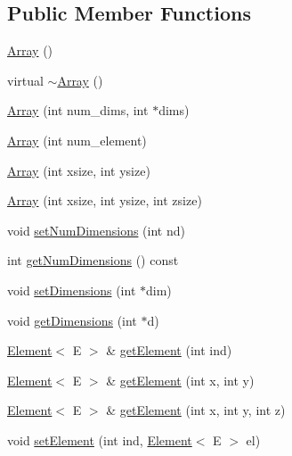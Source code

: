 \subsection*{Public Member Functions}
\begin{DoxyCompactItemize}
\item 
\mbox{\hyperlink{classbridges_1_1_array_a958421b86ff55303b5fc7d505109f9fe}{Array}} ()
\item 
virtual \mbox{\hyperlink{classbridges_1_1_array_aa80b2d2ebc4c27e74a8eaaeb6907b474}{$\sim$\+Array}} ()
\item 
\mbox{\hyperlink{classbridges_1_1_array_a25ff771f9ba7f365465f309ed2dd3688}{Array}} (int num\+\_\+dims, int $\ast$dims)
\item 
\mbox{\hyperlink{classbridges_1_1_array_a859819bc374aa90fcd84b1314034fbbf}{Array}} (int num\+\_\+element)
\item 
\mbox{\hyperlink{classbridges_1_1_array_a13b26fc4d2ccb19b277b2acc615efce2}{Array}} (int xsize, int ysize)
\item 
\mbox{\hyperlink{classbridges_1_1_array_a3504e71cacffd343edf8b9ea16f75eb4}{Array}} (int xsize, int ysize, int zsize)
\item 
void \mbox{\hyperlink{classbridges_1_1_array_a6b91612bb7b89a563571fd1ea417ef2a}{set\+Num\+Dimensions}} (int nd)
\item 
int \mbox{\hyperlink{classbridges_1_1_array_a31edfcff05dd4102fee1840ee915319e}{get\+Num\+Dimensions}} () const
\item 
void \mbox{\hyperlink{classbridges_1_1_array_a4e179915ab7820bbafe9b3433656b182}{set\+Dimensions}} (int $\ast$dim)
\item 
void \mbox{\hyperlink{classbridges_1_1_array_ae195a6f06157e82c68483ff636e30f5e}{get\+Dimensions}} (int $\ast$d)
\item 
\mbox{\hyperlink{classbridges_1_1_element}{Element}}$<$ E $>$ \& \mbox{\hyperlink{classbridges_1_1_array_ac5ff703692153e1831cbea6edd3007e7}{get\+Element}} (int ind)
\item 
\mbox{\hyperlink{classbridges_1_1_element}{Element}}$<$ E $>$ \& \mbox{\hyperlink{classbridges_1_1_array_acd5e730e0369b1fa699a5907e889f213}{get\+Element}} (int x, int y)
\item 
\mbox{\hyperlink{classbridges_1_1_element}{Element}}$<$ E $>$ \& \mbox{\hyperlink{classbridges_1_1_array_a7006eeac547c391cb7e8eb19c56ae9f6}{get\+Element}} (int x, int y, int z)
\item 
void \mbox{\hyperlink{classbridges_1_1_array_aa4609a029a5c988c0bb2908030fd9dc5}{set\+Element}} (int ind, \mbox{\hyperlink{classbridges_1_1_element}{Element}}$<$ E $>$ el)

\end{DoxyCompactItemize}
